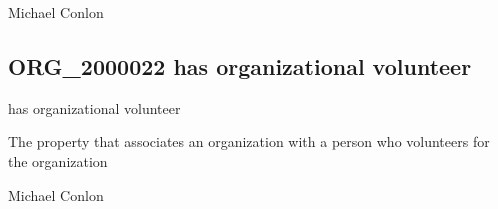 \documentclass[letterpaper,10pt,english]{sphinxmanual}
\begin{document}
\begin{sphinxShadowBox}

\sphinxAtStartPar
Michael Conlon 
\end{sphinxShadowBox}
\begin{quote}

\ignorespaces \end{quote}


\subsection{ORG\_2000022 \sphinxhyphen{} has organizational volunteer}
\label{\detokenize{doc-ORG_2000022:org-2000022-has-organizational-volunteer}}\label{\detokenize{doc-ORG_2000022:index-0}}\label{\detokenize{doc-ORG_2000022::doc}}
\begin{sphinxShadowBox}

\sphinxAtStartPar
has organizational volunteer
\end{sphinxShadowBox}

\begin{sphinxShadowBox}

\sphinxAtStartPar
{}
\end{sphinxShadowBox}

\begin{sphinxShadowBox}

\sphinxAtStartPar
The property that associates an organization with a person who volunteers for the organization
\end{sphinxShadowBox}

\begin{sphinxShadowBox}

\sphinxAtStartPar
Michael Conlon 
\end{sphinxShadowBox}

\begin{sphinxShadowBox}

\sphinxAtStartPar
{\hyperref[\detokenize{doc-ORG_0000001::doc}]{}}
\end{sphinxShadowBox}
\end{document}
